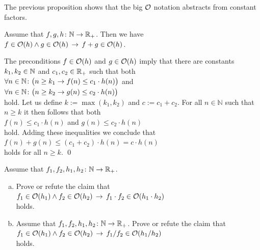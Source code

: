 \remark 
The previous proposition shows that the big $\mathcal{O}$ notation abstracts
from constant factors. 

\begin{Proposition}
Assume that $f,g,h \colon {\mathbb N} \rightarrow {{\mathbb R}_+}$. Then we have 
\\[0.2cm]
\hspace*{1.3cm}
$f \in \mathcal{O}(h) \wedge g \in \mathcal{O}(h) \,\rightarrow\, f + g \in \mathcal{O}(h)$.
\end{Proposition}

\proof
The preconditions $f \in \mathcal{O}(h)$ and $g \in \mathcal{O}(h)$ imply that there are constants $k_1,k_2\in {\mathbb N}$
and $c_1,c_2\in {\mathbb R}_+$ such that both \\[0.2cm]
\hspace*{1.3cm} 
$\forall n \in {\mathbb N} \colon \bigl( n \geq k_1 \rightarrow f(n) \leq c_1 \cdot h(n)\bigr)$ 
\quad and
\\[0.2cm]
\hspace*{1.3cm} 
$\forall n \in {\mathbb N} \colon\bigl( n \geq k_2 \rightarrow g(n) \leq c_2 \cdot h(n)\bigr)$
\\[0.2cm]
hold.  Let us define $k := \max(k_1,k_2)$ and $c:= c_1 + c_2$.  For all $n \in \mathbb{N}$ such
that $n \geq k$ it then follows that both
\\[0.2cm]
\hspace*{1.3cm}
 $f(n) \leq c_1 \cdot h(n)$ \quad and \quad  $g(n) \leq c_2 \cdot h(n)$
\\[0.2cm]
hold.  Adding these inequalities we conclude that 
\\[0.2cm]
\hspace*{1.3cm} $f(n) + g(n) \leq (c_1 + c_2) \cdot h(n) = c \cdot h(n)$
\\[0.2cm]
holds for all $n \geq k$.
\qed

\exercise
Assume that $f_1,f_2,h_1,h_2 \colon {\mathbb N} \rightarrow {{\mathbb R}_+}$.
\begin{enumerate}[(a)]
\item Prove or refute the claim that 
      \\[0.2cm]
      \hspace*{1.3cm}
      $f_1 \in \mathcal{O}(h_1) \wedge f_2 \in \mathcal{O}(h_2) \,\rightarrow\, f_1 \cdot f_2 \in \mathcal{O}(h_1 \cdot h_2)$
      \\[0.2cm]
      holds.  
\item Assume that $f_1,f_2,h_1,h_2 \colon {\mathbb N} \rightarrow {{\mathbb R}_+}$.  Prove or refute the claim that 
      \\[0.2cm]
      \hspace*{1.3cm}
      $f_1 \in \mathcal{O}(h_1) \wedge f_2 \in \mathcal{O}(h_2) \,\rightarrow\, f_1 / f_2 \in \mathcal{O}(h_1 / h_2)$
      \\[0.2cm]
      holds.  \eoxs
\end{enumerate}

